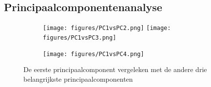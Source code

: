 \documentclass[a4paper,kulak]{kulakarticle}
\begin{document}
\subsection{Principaalcomponentenanalyse}
\begin{figure}
	\centering
	\begin{subfigure}{\linewidth}
		\texttt{[image: figures/PC1vsPC2.png]}
		\texttt{[image: figures/PC1vsPC3.png]}
	\end{subfigure}
	\begin{subfigure}{\linewidth}
		\centering

	\end{subfigure}
	\begin{subfigure}{\linewidth}
		\centering
		\texttt{[image: figures/PC1vsPC4.png]}
	\end{subfigure}
	\caption{De eerste principaalcomponent vergeleken met de andere drie belangrijkste principaalcomponenten}
	\label{fig:vglPC}
\end{figure}

 
\end{document}
